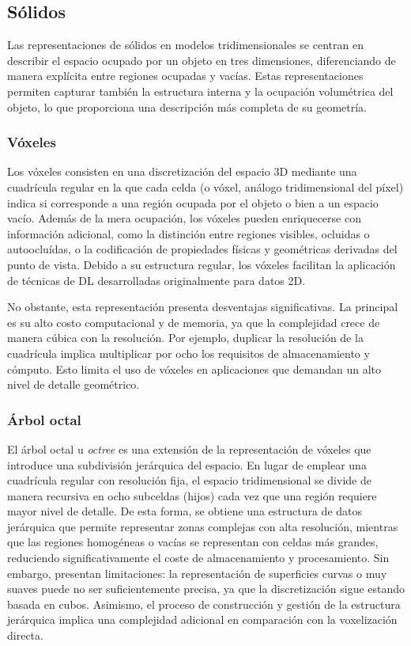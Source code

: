 \subsection{Sólidos}
Las representaciones de sólidos en modelos tridimensionales se centran en describir el espacio ocupado por un objeto en tres dimensiones, diferenciando de manera explícita entre regiones ocupadas y vacías. Estas representaciones permiten capturar también la estructura interna y la ocupación volumétrica del objeto, lo que proporciona una descripción más completa de su geometría.

\subsubsection{Vóxeles}
Los vóxeles consisten en una discretización del espacio 3D mediante una cuadrícula regular en la que cada celda (o vóxel, análogo tridimensional del píxel) indica si corresponde a una región ocupada por el objeto o bien a un espacio vacío. Además de la mera ocupación, los vóxeles pueden enriquecerse con información adicional, como la distinción entre regiones visibles, ocluidas o autoocluídas, o la codificación de propiedades físicas y geométricas derivadas del punto de vista. Debido a su estructura regular, los vóxeles facilitan la aplicación de técnicas de DL desarrolladas originalmente para datos 2D.

No obstante, esta representación presenta desventajas significativas. La principal es su alto costo computacional y de memoria, ya que la complejidad crece de manera cúbica con la resolución. Por ejemplo, duplicar la resolución de la cuadrícula implica multiplicar por ocho los requisitos de almacenamiento y cómputo. Esto limita el uso de vóxeles en aplicaciones que demandan un alto nivel de detalle geométrico.

\subsubsection{Árbol octal}
El árbol octal u \textit{octree} es una extensión de la representación de vóxeles que introduce una subdivisión jerárquica del espacio. En lugar de emplear una cuadrícula regular con resolución fija, el espacio tridimensional se divide de manera recursiva en ocho subceldas (hijos) cada vez que una región requiere mayor nivel de detalle. De esta forma, se obtiene una estructura de datos jerárquica que permite representar zonas complejas con alta resolución, mientras que las regiones homogéneas o vacías se representan con celdas más grandes, reduciendo significativamente el coste de almacenamiento y procesamiento. Sin embargo, presentan limitaciones: la representación de superficies curvas o muy suaves puede no ser suficientemente precisa, ya que la discretización sigue estando basada en cubos. Asimismo, el proceso de construcción y gestión de la estructura jerárquica implica una complejidad adicional en comparación con la voxelización directa.

